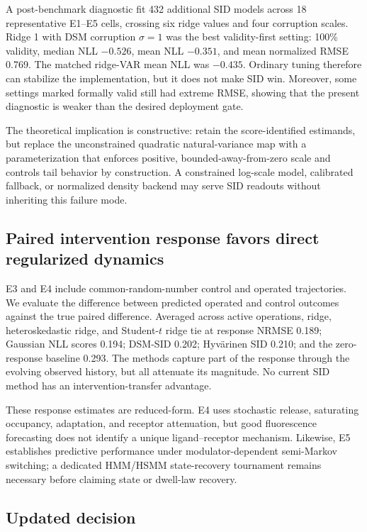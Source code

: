 A post-benchmark diagnostic fit 432 additional SID models across 18 representative
E1--E5 cells, crossing six ridge values and four corruption scales. Ridge 1 with DSM
corruption $\sigma=1$ was the best validity-first setting: 100\% validity, median NLL
$-0.526$, mean NLL $-0.351$, and mean normalized RMSE 0.769. The matched ridge-VAR mean
NLL was $-0.435$. Ordinary tuning therefore can stabilize the implementation, but it
does not make SID win. Moreover, some settings marked formally valid still had extreme
RMSE, showing that the present diagnostic is weaker than the desired deployment gate.

The theoretical implication is constructive: retain the score-identified estimands,
but replace the unconstrained quadratic natural-variance map with a parameterization
that enforces positive, bounded-away-from-zero scale and controls tail behavior by
construction. A constrained log-scale model, calibrated fallback, or normalized
density backend may serve SID readouts without inheriting this failure mode.

\subsection{Paired intervention response favors direct regularized dynamics}

E3 and E4 include common-random-number control and operated trajectories. We evaluate
the difference between predicted operated and control outcomes against the true paired
difference. Averaged across active operations, ridge, heteroskedastic ridge, and
Student-$t$ ridge tie at response NRMSE 0.189; Gaussian NLL scores 0.194;
DSM-SID 0.202; Hyv\"arinen SID 0.210; and the zero-response baseline 0.293. The methods
capture part of the response through the evolving observed history, but all attenuate
its magnitude. No current SID method has an intervention-transfer advantage.

These response estimates are reduced-form. E4 uses stochastic release, saturating
occupancy, adaptation, and receptor attenuation, but good fluorescence forecasting does
not identify a unique ligand--receptor mechanism. Likewise, E5 establishes predictive
performance under modulator-dependent semi-Markov switching; a dedicated HMM/HSMM
state-recovery tournament remains necessary before claiming state or dwell-law recovery.

\subsection{Updated decision}

